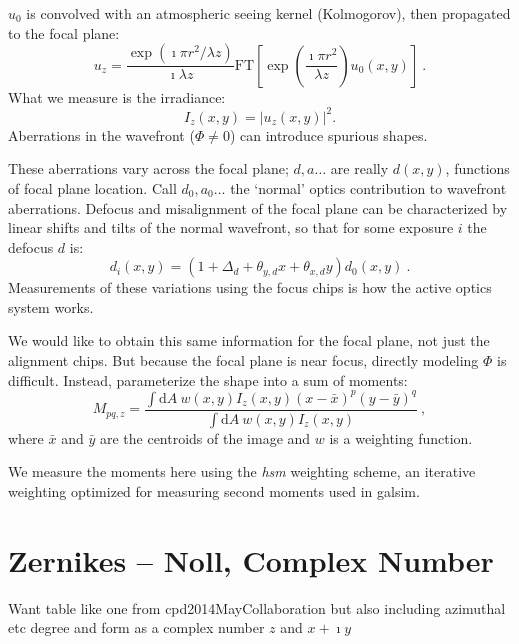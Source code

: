 \documentclass[aas_macros,preprint]{aastex}%
\renewcommand{\exp}[1]{\operatorname{exp}\left(#1\right)} %
\newcommand{\dd}{\mathrm{d}}
\begin{document}
$u_0$ is convolved with an atmospheric seeing kernel (Kolmogorov), then
propagated to the focal plane:
\begin{equation}
  \label{eq:u}
  u_z = \frac{\exp{\imath \pi r^2 / \lambda z}}{\imath \lambda z} \mathrm{FT}\left[
  \exp{\frac{\imath \pi r^2}{\lambda z}} u_0 (x, y) \right] \ .
\end{equation}
What we measure is the irradiance:
\begin{equation}
  I_z(x, y) = | u_z (x, y) |^2 .
\end{equation}
Aberrations in the wavefront ($\Phi \neq 0$) can introduce spurious shapes.


  These aberrations vary across the focal plane; $d, a \dots$
  are really $d(x, y)$, functions of focal plane location. Call $d_0, a_0
  \dots$ the `normal' optics contribution to wavefront aberrations. Defocus and
  misalignment of the focal plane can be characterized by linear shifts and
  tilts of the normal wavefront, so that for some exposure $i$ the defocus $d$
  is:
  \begin{equation}
    \label{eq:deviation}
    d_i(x, y) = (1 + \Delta_d + \theta_{y,d} x + \theta_{x,d} y)d_0(x, y) \ .
  \end{equation}
  Measurements of these variations using the focus chips is how the active
  optics system works.

  We would like to obtain this same information for the focal plane, not just
  the alignment chips. But because the focal plane is near focus, directly
  modeling $\Phi$ is difficult.  Instead, parameterize the shape into a sum of
  moments:
  \begin{equation}
    \label{eq:moments}
    M_{pq, z} = \frac{\int \dd A \ w(x,y) I_z(x,y) (x-\bar{x})^p
    (y-\bar{y})^q}{\int \dd A \ w(x,y) I_z(x,y)} \ ,
  \end{equation}
  where $\bar{x}$ and $\bar{y}$ are the centroids of the image and $w$ is a
  weighting function.

  We measure the moments here using the \textit{hsm} weighting scheme, an
  iterative weighting optimized for measuring second moments used in galsim.

\section{Zernikes -- Noll, Complex Number}

Want table like one from cpd2014MayCollaboration but also including azimuthal
etc degree and form as a complex number $z$ and $x + \imath y$
\end{document}
